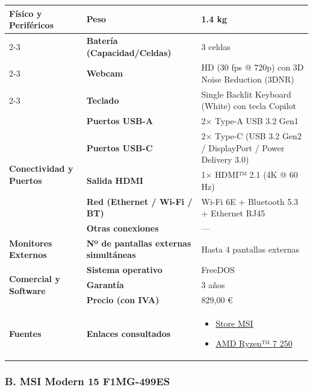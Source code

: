 \documentclass[11.5pt]{article}
\begin{document}
\begin{table}[H]
\begin{tabularx}{\textwidth}{|l|l|X|}
			\hline
			\multirow{4}{*}{\textbf{Físico y Periféricos}} 
			& \textbf{Peso} & 1.4 kg \\
			\cline{2-3}
			& \textbf{Batería (Capacidad/Celdas)} & 3 celdas \\
			\cline{2-3}
			& \textbf{Webcam} & HD (30 fps @ 720p) con 3D Noise Reduction (3DNR) \\
			\cline{2-3}
			& \textbf{Teclado} & Single Backlit Keyboard (White) con tecla Copilot \\
			\hline
			\multirow{5}{*}{\textbf{Conectividad y Puertos}} 
			& \textbf{Puertos USB-A} & 2\(\times\) Type-A USB 3.2 Gen1 \\
			\cline{2-3}
			& \textbf{Puertos USB-C} & 2\(\times\) Type-C (USB 3.2 Gen2 / DisplayPort / Power Delivery 3.0) \\
			\cline{2-3}
			& \textbf{Salida HDMI} & 1\(\times\) HDMI™ 2.1 (4K @ 60 Hz) \\
			\cline{2-3}
			& \textbf{Red (Ethernet / Wi-Fi / BT)} & Wi-Fi 6E + Bluetooth 5.3 + Ethernet RJ45 \\
			\cline{2-3}
			& \textbf{Otras conexiones} & --- \\
			\hline
			\textbf{Monitores Externos} & \textbf{Nº de pantallas externas simultáneas} & Hasta 4 pantallas externas \\
			\hline
			\multirow{3}{*}{\textbf{Comercial y Software}} 
			& \textbf{Sistema operativo} & FreeDOS \\
			\cline{2-3}
			& \textbf{Garantía} & 3 años \\
			\cline{2-3}
			& \textbf{Precio (con IVA)} & 829,00 € \\
			\hline
			\textbf{Fuentes} & \textbf{Enlaces consultados} & 
			\begin{itemize}[leftmargin=*,nosep]
				\item \href{https://es-store.msi.com/products/modern-a14-ai-f2hmg-009xes-portatiles}{Store MSI}
				\item \href{https://www.amd.com/es/products/processors/laptop/ryzen/200-series/amd-ryzen-7-250.html}{AMD Ryzen™ 7 250}
			\end{itemize} \\
			\hline
		\end{tabularx}
	\end{table}
	
	\subsubsection*{B. MSI Modern 15 F1MG-499ES}
	
\end{document}
